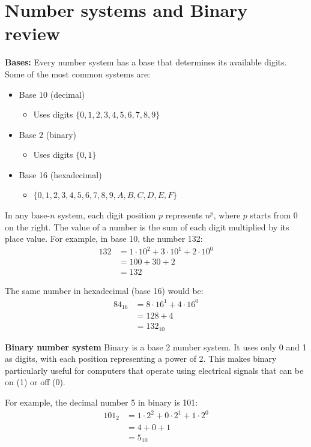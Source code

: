 \documentclass[12pt]{labmanual}
\begin{document}
\section{Number systems and Binary review}
\noindent\textbf{Bases:}\hfill\break
Every number system has a base that determines its available digits. Some of the most common systems are:
\begin{itemize}
    \item Base 10 (decimal)
    \begin{itemize}
        \item Uses digits $\{0,1,2,3,4,5,6,7,8,9\}$
    \end{itemize}
    \item Base 2 (binary) 
    \begin{itemize}
        \item Uses digits $\{0,1\}$
    \end{itemize}
    \item Base 16 (hexadecimal)
    \begin{itemize}
        \item $\{0,1,2,3,4,5,6,7,8,9,A,B,C,D,E,F\}$
    \end{itemize}
\end{itemize}

In any base-$n$ system, each digit position $p$ represents $n^p$, where $p$ starts from 0 on the right. The value of a number is the sum of each digit multiplied by its place value.
For example, in base 10, the number 132:
\begin{align*}    
132 &= 1 \cdot 10^2 + 3 \cdot 10^1 + 2 \cdot 10^0
\\&= 100 + 30 + 2
\\&= 132
\end{align*}

The same number in hexadecimal (base 16) would be:
\begin{align*}    
84_{16} &= 8 \cdot 16^1 + 4 \cdot 16^0 \\
&= 128 + 4 \\
&= 132_{10}
\end{align*}

\noindent\textbf{Binary number system}\hfill\break
Binary is a base 2 number system. It uses only 0 and 1 as digits, with each position representing a power of 2. This makes binary particularly useful for computers that operate using electrical signals that can be on (1) or off (0).

For example, the decimal number 5 in binary is 101:
\begin{align*}
101_2 &= 1 \cdot 2^2 + 0 \cdot 2^1 + 1 \cdot 2^0 \\
&= 4 + 0 + 1 \\
&= 5_{10}
\end{align*}
\end{document}
